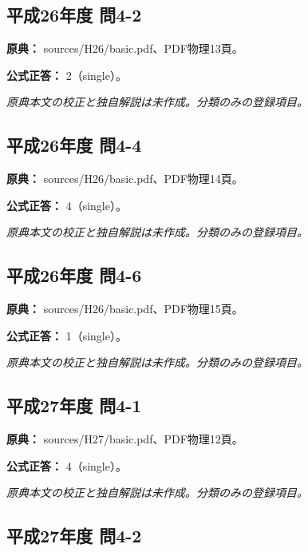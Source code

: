 \subsection{平成26年度 問4-2}
\label{q:h26-reg-basic-4-2}

\noindent\textbf{原典：} sources/H26/basic.pdf、PDF物理13頁。

\textbf{公式正答：} 2（single）。

\par\textit{原典本文の校正と独自解説は未作成。分類のみの登録項目。}

\subsection{平成26年度 問4-4}
\label{q:h26-reg-basic-4-4}

\noindent\textbf{原典：} sources/H26/basic.pdf、PDF物理14頁。

\textbf{公式正答：} 4（single）。

\par\textit{原典本文の校正と独自解説は未作成。分類のみの登録項目。}

\subsection{平成26年度 問4-6}
\label{q:h26-reg-basic-4-6}

\noindent\textbf{原典：} sources/H26/basic.pdf、PDF物理15頁。

\textbf{公式正答：} 1（single）。

\par\textit{原典本文の校正と独自解説は未作成。分類のみの登録項目。}

\subsection{平成27年度 問4-1}
\label{q:h27-reg-basic-4-1}

\noindent\textbf{原典：} sources/H27/basic.pdf、PDF物理12頁。

\textbf{公式正答：} 4（single）。

\par\textit{原典本文の校正と独自解説は未作成。分類のみの登録項目。}

\subsection{平成27年度 問4-2}
\label{q:h27-reg-basic-4-2}

